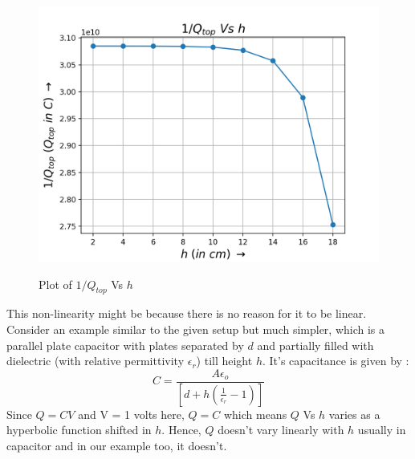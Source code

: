 \documentclass[11pt, a4paper]{article}
\begin{document}
\begin{figure}[H]
  \centering
  \includegraphics[scale=0.6]{qtop_hyper.png}
  \label{fig:qtop_hyper}
  \caption{Plot of $1/Q_{top}$ Vs $h$}
\end{figure}
This non-linearity might be because there is no reason for it to be linear.
\\
Consider an example similar to the given setup but much simpler, which is a parallel plate capacitor with plates separated by $d$ and partially filled with dielectric (with relative permittivity $\epsilon_r$) till height $h$.
It's capacitance is given by :
\[
  C = \frac{A\epsilon_o}{[d + h(\frac{1}{\epsilon_r} - 1)]}
\]
Since $Q = CV$ and V = 1 volts here, $Q = C$ which means $Q$ Vs $h$ varies as a hyperbolic function shifted in $h$.
Hence, $Q$ doesn't vary linearly with $h$ usually in capacitor and in our example too, it doesn't.
\end{document}
